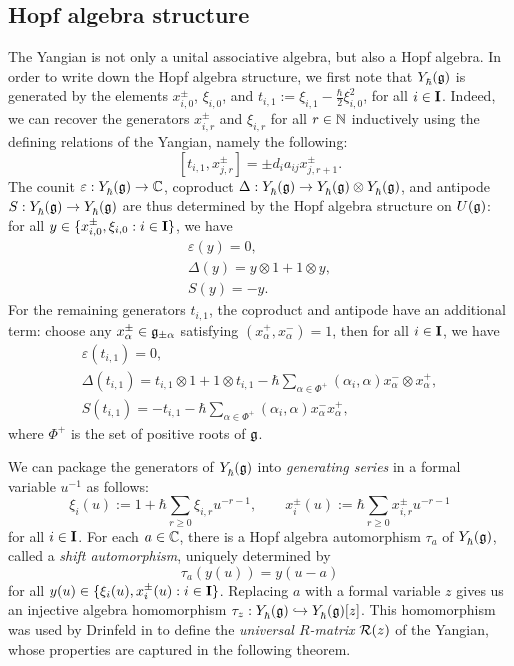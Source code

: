 \subsection{Hopf algebra structure}\label{ssec:Y-Hopf}

The Yangian is not only a unital associative algebra, but also a Hopf algebra.
In order to write down the Hopf algebra structure, we first note that $\Yhg$ is generated by the elements $x^\pm_{i,0}$, $\xi_{i,0}$, and $t_{i,1} := \xi_{i,1}-\frac{\hbar}{2}\xi_{i,0}^2$, for all $i\in\I$.
Indeed, we can recover the generators $x^\pm_{i,r}$ and $\xi_{i,r}$ for all $r\in\N$ inductively using the defining relations of the Yangian, namely the following:
\[[t_{i,1}, x^\pm_{j,r}] = \pm d_ia_{ij}x^\pm_{j,r+1}.\]
The counit $\varepsilon:\Yhg\to\C$, coproduct $\Delta:\Yhg\to\Yhg\otimes\Yhg$, and antipode $S:\Yhg\to\Yhg$ are thus determined by the Hopf algebra structure on $\Ug$: for all $y\in\{x^\pm_{i,0},\xi_{i,0} : i\in\I\}$, we have
\begin{gather*}
    \varepsilon(y) = 0, \\
    \Delta(y) = y\otimes 1 + 1\otimes y, \\
    S(y) = -y.
\end{gather*}
For the remaining generators $t_{i,1}$, the coproduct and antipode have an additional term: choose any $x^\pm_\alpha\in\g_{\pm\alpha}$ satisfying $(x^+_\alpha,x^-_\alpha)=1$, then for all $i\in\I$, we have
\begin{gather*}
    \varepsilon(t_{i,1}) = 0, \\
    \Delta(t_{i,1}) = t_{i,1}\otimes 1 + 1\otimes t_{i,1} - \hbar\sum_{\alpha\in\Phi^+}(\alpha_i,\alpha) x^-_\alpha \otimes x^+_\alpha, \\
    S(t_{i,1}) = -t_{i,1} - \hbar\sum_{\alpha\in\Phi^+}(\alpha_i,\alpha) x^-_\alpha x^+_\alpha,
\end{gather*}
where $\Phi^+$ is the set of positive roots of $\g$.

We can package the generators of $\Yhg$ into \emph{generating series} in a formal variable $u^{-1}$ as follows:
\begin{equation}\label{eqn:gen-series}
    \xi_i(u) := 1+\hbar\sum_{r\geq 0}\xi_{i,r}u^{-r-1}, \qquad x^\pm_i(u) := \hbar\sum_{r\geq 0}x^\pm_{i,r}u^{-r-1}
\end{equation}
for all $i\in\I$.
For each $a\in\C$, there is a Hopf algebra automorphism $\tau_a$ of $\Yhg$, called a \emph{shift automorphism}, uniquely determined by
\[\tau_a(y(u)) = y(u-a)\]
for all $y(u)\in\{\xi_i(u),x^\pm_i(u) : i\in\I\}$.
Replacing $a$ with a formal variable $z$ gives us an injective algebra homomorphism $\tau_z:\Yhg\inj\Yhg[][z]$.
This homomorphism was used by Drinfeld in \cite{drinfeld_hopf_1985} to define the \emph{universal $R$-matrix} $\rmat(z)$ of the Yangian, whose properties are captured in the following theorem.

